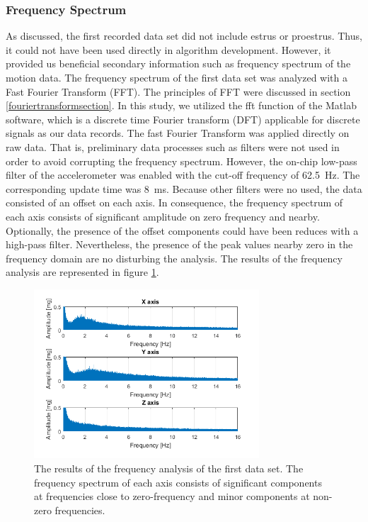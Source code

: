 \documentclass[english,12pt,a4paper,pdftex,elec,utf8]{aaltothesis}
\begin{document}
\subsubsection{Frequency Spectrum}

As discussed, the first recorded data set did not include estrus or proestrus. Thus, it could not have been used directly in algorithm development. However, it provided us beneficial secondary information such as frequency spectrum of the motion data. The frequency spectrum of the first data set was analyzed with a Fast Fourier Transform (FFT). The principles of FFT were discussed in section \ref{fouriertransformsection}. In this study, we utilized the fft function of the Matlab software, which is a discrete time Fourier transform (DFT) applicable for discrete signals as our data records. The fast Fourier Transform was applied directly on raw data. That is, preliminary data processes such as filters were not used in order to avoid corrupting the frequency spectrum. However, the on-chip low-pass filter of the accelerometer was enabled with the cut-off frequency of \SI{62.5}{\hertz}. The corresponding update time was \SI{8}{\milli\second}. Because other filters were no used, the data consisted of an offset on each axis. In consequence, the frequency spectrum of each axis consists of significant amplitude on zero frequency and nearby. Optionally, the presence of the offset components could have been reduces with a high-pass filter. Nevertheless, the presence of the peak values nearby zero in the frequency domain are no disturbing the analysis. The results of the frequency analysis are represented in figure \ref{frequenyspectrumfigure}. 


\begin{figure}[h]
\centering
\includegraphics[width = 0.75\textwidth]{figures/frequencyanalysis2.png}
\caption{The results of the frequency analysis of the first data set. The frequency spectrum of each axis consists of significant components at frequencies close to zero-frequency and minor components at non-zero frequencies.} \label{frequenyspectrumfigure}
\end{figure}
\end{document}
